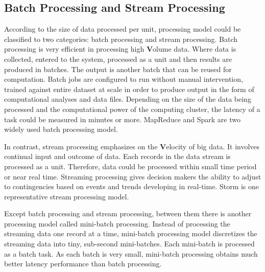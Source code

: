 \subsection{Batch Processing and Stream Processing}
According to the size of data processed per unit, processing model could be classified to two categories: batch processing and stream processing. Batch processing is very efficient in processing high \textbf{V}olume data. Where data is collected, entered to the system, processed as a unit and then results are produced in batches.  The output is another batch that can be reused for computation. Batch jobs are configured to run without manual intervention, trained against entire dataset at scale in order to produce output in the form of computational analyses and data files. Depending on the size of the data being processed and the computational power of the computing cluster, the latency of a task could be measured in minutes or more. MapReduce and Spark are two widely used batch processing model.
 
In contrast, stream processing emphasizes on the \textbf{V}elocity of big data. It involves continual input and outcome of data. Each records in the data stream is processed as a unit. Therefore, data could be processed within small time period or near real time.  Streaming processing gives decision makers the ability to adjust to contingencies based on events and trends developing in real-time. Storm is one representative stream processing model. 

Except batch processing and stream processing, between them there is another processing model called mini-batch processing. Instead of processing the streaming data one record at a time, mini-batch processing model discretizes the streaming data into tiny, sub-second mini-batches. Each mini-batch is processed as a batch task. As each batch is very small, mini-batch processing obtains much better latency performance than batch processing.

